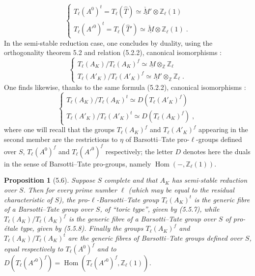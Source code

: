 \documentclass[11pt]{article}
\theoremstyle{plain}
\newtheorem{proposition}[theorem]{Proposition}
\theoremstyle{definition}
\theoremstyle{remark}
\newcommand{\ZZ}{\mathbb Z}
\DeclareMathOperator{\Hom}{Hom}
\newcommand{\Tl}{T_\ell}
\begin{document}
\begin{equation}
\begin{cases}
\Tl(A^0)^t = \Tl(\hat{T}) \simeq \check{\underline{M}}' \otimes
\ZZ_{\ell}(1) \\[1ex]
\Tl(A'^0)^t = \Tl(\hat{T}') \simeq \check{\underline{M}} \otimes
\ZZ_{\ell}(1) \; .
\end{cases}
\end{equation}
In the semi-stable reduction case, one concludes by duality, using the
orthogonality theorem 5.2 and relation (5.2.2), canonical isomorphisms :
\begin{equation}
\begin{cases}
\Tl(A_K)/\Tl(A_K)^f \simeq \underline{M} \otimes_{\ZZ} \ZZ_{\ell}
\\[1ex]
\Tl(A'_K)/\Tl(A'_K)^f \simeq \underline{M}' \otimes_{\ZZ} \ZZ_{\ell}
\; .
\end{cases}
\end{equation}
One finds likewise, thanks to the same formula (5.2.2), canonical
isomorphisms :
\begin{equation}
\begin{cases}
\Tl(A_K)/\Tl(A_K)^t \simeq D(\Tl(A'_K)^f) \\[1ex]
\Tl(A'_K)/\Tl(A'_K)^t \simeq D(\Tl(A_K)^f) \; ,
\end{cases}
\end{equation}
where one will recall that the groups $\Tl(A_K)^f$ and $\Tl(A'_K)^f$
appearing in the second member are the restrictions to $\eta$ of
Barsotti--Tate pro-$\ell$-groups defined over $S$, $\Tl(A^0)^f$ and
$\Tl(A'^0)^f$ respectively; the letter $D$ denotes here the duals in
the sense of Barsotti--Tate pro-groups, namely $\Hom(-, \ZZ_{\ell}(1))$.

\begin{proposition}[5.6]
Suppose $S$ complete and that $A_K$ has semi-stable reduction over $S$.
Then for every prime number $\ell$ (which may be equal to the residual
characteristic of $S$), the pro-$\ell$-Barsotti--Tate group
$\Tl(A_K)^t$ is the generic fibre of a Barsotti--Tate group over $S$,
of ``toric type'', given by (5.5.7), while $\Tl(A_K)/\Tl(A_K)^f$ is the
generic fibre of a Barsotti--Tate group over $S$ of pro-\'etale type,
given by (5.5.8). Finally the groups $\Tl(A_K)^f$ and
$\Tl(A_K)/\Tl(A_K)^t$ are the generic fibres of Barsotti--Tate groups
defined over $S$, equal respectively to $\Tl(A^0)^f$ and to
$D(\Tl(A'^0)^f) = \Hom(\Tl(A'^0)^f, \ZZ_{\ell}(1))$.
\end{proposition}
\end{document}
